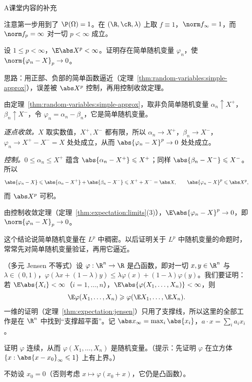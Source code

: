 \begin{exercises}{A}{课堂内容的补充}
\begin{solution}
注意第一步用到了 $\P(\Omega)=1$。在 $(\R,\cR,\lambda)$ 上取 $f\equiv1$，$\norm f_\infty=1$，而 $\norm f_p=\infty$ 对一切 $p<\infty$ 成立。
\end{solution}

\item\label{ex:expectation:A13} 设 $1\leqslant p<\infty$，$\E\abs X^p<\infty$。证明存在简单随机变量 $\varphi_n$，使 $\norm{\varphi_n-X}_p\to0$。
\begin{solution}
思路：用正部、负部的简单函数逼近（定理~\ref{thm:random-variables:simple-approx}），误差被 $\abs X^p$ 控制，再用控制收敛定理。

由定理~\ref{thm:random-variables:simple-approx}，取非负简单随机变量 $\alpha_n\uparrow X^+$，$\beta_n\uparrow X^-$，令 $\varphi_n=\alpha_n-\beta_n$，它是简单随机变量。

\emph{逐点收敛。}$X$ 取实数值，$X^+,X^-$ 都有限，所以 $\alpha_n\to X^+$，$\beta_n\to X^-$，$\varphi_n\to X^+-X^-=X$ 处处成立，从而 $\abs{\varphi_n-X}^p\to0$ 处处成立。

\emph{控制。}$0\leqslant\alpha_n\leqslant X^+$ 蕴含 $\abs{\alpha_n-X^+}\leqslant X^+$；同样 $\abs{\beta_n-X^-}\leqslant X^-$。所以
\[
\abs{\varphi_n-X}\leqslant\abs{\alpha_n-X^+}+\abs{\beta_n-X^-}\leqslant X^++X^-=\abs X,\qquad\abs{\varphi_n-X}^p\leqslant\abs X^p,
\]
而 $\abs X^p$ 可积。

由控制收敛定理（定理~\ref{thm:expectation:limits}(3)），$\E\abs{\varphi_n-X}^p\to0$，即 $\norm{\varphi_n-X}_p\to0$。

这个结论说简单随机变量在 $L^p$ 中稠密。以后证明关于 $L^p$ 中随机变量的命题时，常常先对简单随机变量验证，再用它逼近。
\end{solution}

\item\label{ex:expectation:A14} （多元 Jensen 不等式）设 $\varphi:\R^n\to\R$ 是凸函数，即对一切 $x,y\in\R^n$ 与 $\lambda\in(0,1)$，$\varphi(\lambda x+(1-\lambda)y)\leqslant\lambda\varphi(x)+(1-\lambda)\varphi(y)$。我们要证明：若 $\E\abs{X_i}<\infty$（$i=1,\dots,n$），$\E\abs{\varphi(X_1,\dots,X_n)}<\infty$，则
\[
\E\varphi(X_1,\dots,X_n)\geqslant\varphi(\E X_1,\dots,\E X_n).
\]
一维的证明（定理~\ref{thm:expectation:jensen}）只用了支撑线，所以这里的全部工作是在 $\R^n$ 中找到“支撑超平面”。记 $\abs x_\infty=\max_i\abs{x_i}$，$a\cdot x=\sum_ia_ix_i$。
\begin{questions}
\item 证明 $\varphi$ 连续，从而 $\varphi(X_1,\dots,X_n)$ 是随机变量。（提示：先证明 $\varphi$ 在立方体 $\{x:\abs{x-x_0}_\infty\leqslant1\}$ 上有上界。）
\begin{solution}
不妨设 $x_0=0$（否则考虑 $x\mapsto\varphi(x_0+x)$，它仍是凸函数）。


\end{solution}
\end{questions}
\end{exercises}

